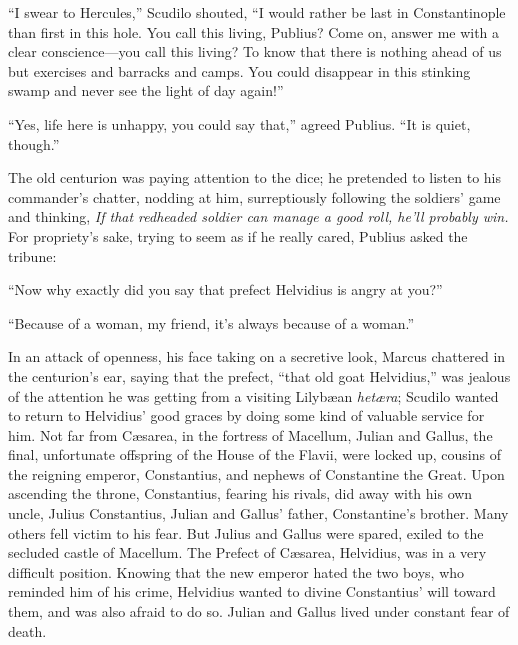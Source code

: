 ``I swear to Hercules,'' Scudilo shouted, ``I would rather be last in Constantinople than first in this hole. You call this living, Publius? Come on, answer me with a clear conscience---you call this living? To know that there is nothing ahead of us but exercises and barracks and camps. You could
disappear in this stinking swamp and never see the light of day again!'' %

``Yes, life here is unhappy, you could say that,'' agreed Publius. ``It is quiet, though.'' %

The old centurion was paying attention to the dice; he pretended to listen to his commander's chatter, nodding at him, surreptiously following the soldiers' game and thinking, \textit{If that redheaded soldier can manage a good roll, he'll probably win.} For propriety's sake, trying to seem as if he really cared, Publius asked the tribune:

``Now why exactly did you say that prefect Helvidius is angry at you?'' %

``Because of a woman, my friend, it's always because of a woman.'' %

In an attack of openness, his face taking on a secretive look, Marcus chattered in the centurion's ear, saying that the prefect, ``that old goat Helvidius,'' was jealous of the attention he was getting from a visiting Lilyb\ae an \textit{het\ae ra}; Scudilo wanted to return to Helvidius' good graces by doing some kind of valuable service for him. Not far from C\ae sarea, in the fortress of Macellum, Julian and Gallus, the final, unfortunate offspring of the House of the Flavii, were locked up, cousins of the reigning emperor, Constantius, and nephews of Constantine the Great. Upon ascending the throne, Constantius, fearing his rivals, did away with his own uncle, Julius Constantius, Julian and Gallus' father, Constantine's brother. Many others fell victim to his fear. But Julius and Gallus were spared, exiled to the secluded castle of Macellum. The Prefect of C\ae sarea, Helvidius, was in a very difficult position. Knowing that the new emperor hated the two boys, who reminded him of his crime, Helvidius wanted to divine Constantius' will toward them, and was also afraid to do so. Julian and Gallus lived under constant fear of death. 